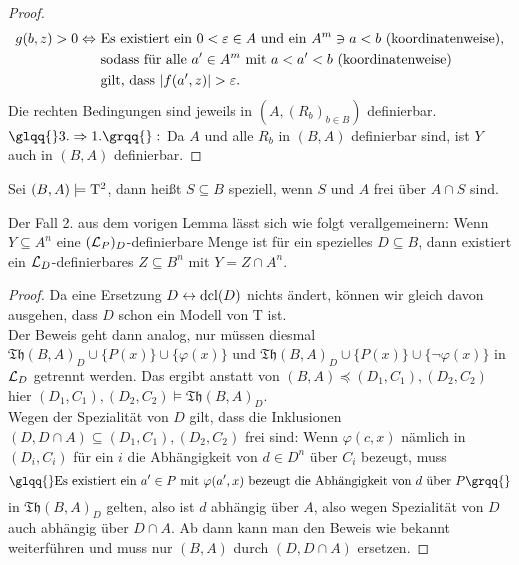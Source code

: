 \begin{proof}
\begin{align*}
	g(b,z)>0\Leftrightarrow\ &\text{Es existiert ein }0<\varepsilon\in A\text{ und ein }A^m\ni a<b\text{ (koordinatenweise),}\\&\text{sodass für alle }a'\in A^m\text{ mit }a<a'<b\text{ (koordinatenweise)}\\&\text{gilt, dass }{\left| f(a',z) \right|}>\varepsilon.
	\end{align*}
	Die rechten Bedingungen sind jeweils in $(A,(R_b)_{b\in B})$ definierbar.\\
	$\glqq{}3.\Rightarrow 1.\grqq{}:$ Da $A$ und alle $R_b$ in $(B,A)$ definierbar sind, ist $Y$ auch in $(B,A)$ definierbar.
\end{proof}

\begin{definition}
	Sei $(B,A)\models\operatorname{T^2}$, dann heißt $S\subseteq B$ speziell, wenn $S$ und $A$ frei über $A\cap S$ sind.
\end{definition}

\begin{lemma}\label{Definierbare Mengen Spezialität}
	Der Fall 2. aus dem vorigen Lemma lässt sich wie folgt verallgemeinern: Wenn $Y\subseteq A^n$ eine $(\mathcal{L}_P)_D$-definierbare Menge ist für ein spezielles $D\subseteq B$, dann existiert ein $\mathcal{L}_D$-definierbares $Z\subseteq B^n$ mit $Y=Z\cap A^n$.
\end{lemma}
\begin{proof}
	Da eine Ersetzung $D\leftrightarrow\operatorname{dcl}(D)$ nichts ändert, können wir gleich davon ausgehen, dass $D$ schon ein Modell von T ist.\\
	Der Beweis geht dann analog, nur müssen diesmal $\mathfrak{Th}(B,A)_D\cup\{P(x)\}\cup\{\varphi(x)\}$ und $\mathfrak{Th}(B,A)_D\cup\{P(x)\}\cup\{\neg\varphi(x)\}$ in $\mathcal{L}_D$ getrennt werden. Das ergibt anstatt von $(B,A)\preceq(D_1,C_1),(D_2,C_2)$ hier $(D_1,C_1),(D_2,C_2)\models\mathfrak{Th}(B,A)_D$.\\
	Wegen der Spezialität von $D$ gilt, dass die Inklusionen $(D,D\cap A)\subseteq(D_1,C_1),(D_2,C_2)$ frei sind: Wenn $\varphi(c,x)$ nämlich in $(D_i,C_i)$ für ein $i$ die Abhängigkeit von $d\in D^n$ über $C_i$ bezeugt, muss $$\glqq{}\text{Es existiert ein }a'\in P\text{ mit }\varphi(a',x)\text{ bezeugt die Abhängigkeit von }d\text{ über }P\grqq{}$$ in $\mathfrak{Th}(B,A)_D$ gelten, also ist $d$ abhängig über $A$, also wegen Spezialität von $D$ auch abhängig über $D\cap A$. Ab dann kann man den Beweis wie bekannt weiterführen und muss nur $(B,A)$ durch $(D,D\cap A)$ ersetzen.
\end{proof}


